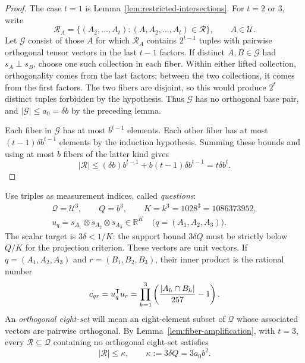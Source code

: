 \begin{proof}
The case \(t=1\) is Lemma~\ref{lem:restricted-intersections}.
For \(t=2\) or \(3\), write
\[
 \mathcal R_A
 =\{(A_2,\ldots,A_t):(A,A_2,\ldots,A_t)\in\mathcal R\},
 \qquad A\in\mathcal U.
\]
Let \(\mathcal G\) consist of those \(A\) for which \(\mathcal R_A\)
contains \(2^{t-1}\) tuples with pairwise orthogonal tensor vectors
in the last \(t-1\) factors.  If distinct \(A,B\in\mathcal G\) had
\(s_A\perp s_B\), choose one such collection in each fiber.
Within either lifted collection, orthogonality comes from the last
factors; between the two collections, it comes from the first factors.
The two fibers are disjoint, so this would produce \(2^t\) distinct
tuples forbidden by the hypothesis.  Thus \(\mathcal G\) has no
orthogonal base pair, and
\(|\mathcal G|\leq a_0=\delta b\) by the preceding lemma.

Each fiber in \(\mathcal G\) has at most \(b^{t-1}\) elements.
Each other fiber has at most \((t-1)\delta b^{t-1}\) elements by the
induction hypothesis.  Summing these bounds and using at most \(b\)
fibers of the latter kind gives
\[
 |\mathcal R|
 \leq (\delta b)b^{t-1}
      +b(t-1)\delta b^{t-1}
 =t\delta b^t.
\]
\end{proof}

Use triples as measurement indices, called \emph{questions}:
\begin{equation}\label{eq:combinatorial-questions}
 \begin{gathered}
 \mathcal Q=\mathcal U^3,\qquad Q=b^3,\qquad
 K=k^3=1028^3=1086373952,\\
 u_q=s_{A_1}\otimes s_{A_2}\otimes s_{A_3}\in\mathbb R^K
 \quad\bigl(q=(A_1,A_2,A_3)\bigr).
 \end{gathered}
\end{equation}
The scalar target is $3\delta<1/K$: the support bound $3\delta Q$
must be strictly below $Q/K$ for the projection criterion.
These vectors are unit vectors.  If \(q=(A_1,A_2,A_3)\) and
\(r=(B_1,B_2,B_3)\), their inner product is the rational number
\begin{equation}\label{eq:combinatorial-question-gram}
 c_{qr}=u_q^{\mathsf T}u_r
 =\prod_{h=1}^3\left(\frac{|A_h\cap B_h|}{257}-1\right).
\end{equation}
An \emph{orthogonal eight-set} will mean an eight-element subset of
\(\mathcal Q\) whose associated vectors are pairwise orthogonal.
By Lemma~\ref{lem:fiber-amplification}, with \(t=3\), every
\(\mathcal R\subseteq\mathcal Q\) containing no orthogonal eight-set
satisfies
\begin{equation}\label{eq:combinatorial-eight-bound}
 |\mathcal R|\leq\kappa,\qquad
 \kappa:=3\delta Q=3a_0b^2.
\end{equation}

